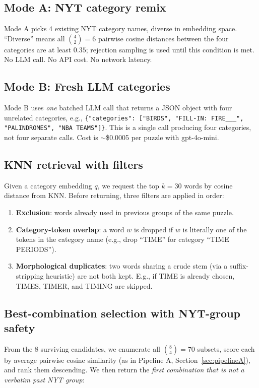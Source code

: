 \documentclass[11pt, letterpaper]{article}
\begin{document}
\subsection{Mode A: NYT category remix}
Mode A picks 4 existing NYT category names, diverse in embedding space. ``Diverse''
means all $\binom{4}{2} = 6$ pairwise cosine distances between the four categories
are at least $0.35$; rejection sampling is used until this condition is met.
No LLM call. No API cost. No network latency.

\subsection{Mode B: Fresh LLM categories}
Mode B uses \emph{one} batched LLM call that returns a JSON object with four
unrelated categories, e.g., \texttt{\{"categories": ["BIRDS", "FILL-IN: FIRE\_\_\_",
"PALINDROMES", "NBA TEAMS"]\}}. This is a single call producing four categories,
not four separate calls. Cost is $\sim$\$0.0005 per puzzle with gpt-4o-mini.

\subsection{KNN retrieval with filters}
\label{sec:knn}
Given a category embedding $q$, we request the top $k=30$ words by cosine distance
from KNN. Before returning, three filters are applied in order:
\begin{enumerate}[leftmargin=*, itemsep=0.1em]
\item \textbf{Exclusion}: words already used in previous groups of the same puzzle.
\item \textbf{Category-token overlap}: a word $w$ is dropped if $w$ is literally
one of the tokens in the category name (e.g., drop ``TIME'' for category
``TIME PERIODS'').
\item \textbf{Morphological duplicates}: two words sharing a crude stem (via a
suffix-stripping heuristic) are not both kept. E.g., if TIME is already chosen,
TIMES, TIMER, and TIMING are skipped.
\end{enumerate}

\subsection{Best-combination selection with NYT-group safety}
\label{sec:combo}
From the 8 surviving candidates, we enumerate all $\binom{8}{4} = 70$ subsets,
score each by average pairwise cosine similarity (as in Pipeline A, Section~\ref{sec:pipelineA}),
and rank them descending. We then return the \emph{first combination that is not a
verbatim past NYT group}:
\end{document}
